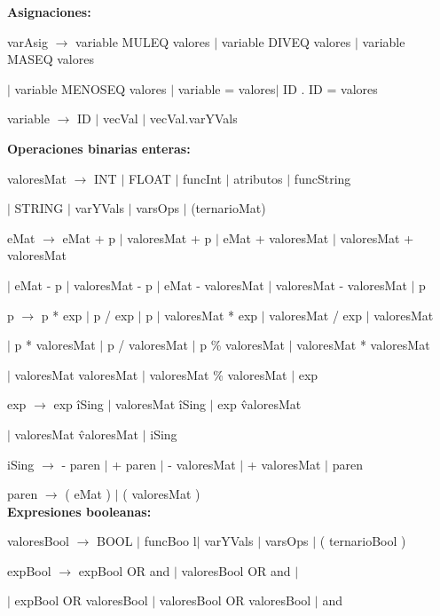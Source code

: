 \documentclass[10pt, a4paper]{article}
\begin{document}
\textbf{Asignaciones:} 

  varAsig $\rightarrow$ variable MULEQ valores $|$ variable DIVEQ valores $|$ variable MASEQ valores
  
  \hspace{15mm}$|$ variable MENOSEQ valores $|$ variable = valores$|$ ID . ID = valores 


variable $\rightarrow$ ID $|$ vecVal $|$ vecVal.varYVals 


\textbf{Operaciones binarias enteras:} 

 valoresMat $\rightarrow$ INT $|$ FLOAT $|$ funcInt $|$ atributos $|$ funcString
 
  \hspace{15mm} $|$ STRING $|$ varYVals $|$ varsOps $|$ (ternarioMat)  
  
 
eMat $\rightarrow$ eMat + p $|$ valoresMat + p $|$ eMat + valoresMat $|$ valoresMat + valoresMat
  
  \hspace{15mm} $|$ eMat - p  $|$ valoresMat - p  $|$ eMat - valoresMat $|$ valoresMat - valoresMat $|$ p
  
 p $\rightarrow$ p * exp $|$ p / exp $|$ p  $|$ valoresMat * exp $|$ valoresMat / exp $|$ valoresMat 
 
   \hspace{15mm} $|$ p * valoresMat $|$ p / valoresMat $|$ p \% valoresMat $|$ valoresMat * valoresMat
   
   \hspace{15mm} $|$ valoresMat \/ valoresMat $|$ valoresMat \% valoresMat $|$ exp
    
 exp $\rightarrow$ exp \^ iSing $|$ valoresMat \^ iSing $|$ exp \^ valoresMat
 
 \hspace{15mm} $|$ valoresMat \^ valoresMat $|$ iSing
  
iSing $\rightarrow$ - paren $|$ + paren $|$ - valoresMat $|$ + valoresMat $|$ paren
  
  
 paren $\rightarrow$ ( eMat )  $|$ ( valoresMat ) \\
  
  
\textbf{Expresiones booleanas:} 

valoresBool $\rightarrow$ BOOL $|$ funcBoo l$|$ varYVals $|$ varsOps $|$ (  ternarioBool )  
 
 expBool $\rightarrow$ expBool OR and $|$ valoresBool OR and $|$
 
 \hspace{15mm}$|$ expBool OR valoresBool $|$ valoresBool OR valoresBool $|$ and
  
\end{document}
